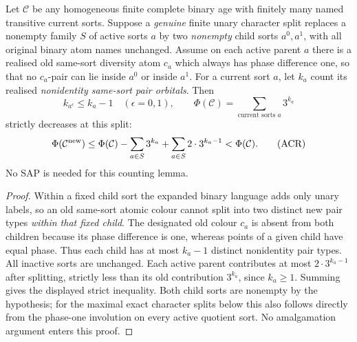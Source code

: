 \begin{lemma}
\label{lem:exact-character-rank-drop}
Let $\mathcal C$ be any homogeneous finite complete
binary age with finitely many named transitive current
sorts. Suppose a \emph{genuine} finite unary character
split replaces a nonempty family $S$ of active sorts
$a$ by two \emph{nonempty} child sorts
$a^0,a^1$, with all original binary atom names
unchanged. Assume on each active parent $a$
there is a realised old same-sort diversity atom
$c_a$ which always has phase difference one,
so that no $c_a$-pair can lie inside
$a^0$ or inside $a^1$.
For a current sort $a$, let $k_a$ count its realised
\emph{nonidentity same-sort pair orbitals}.
Then
\[
 k_{a^\epsilon}\le k_a-1\quad(\epsilon=0,1),
 \qquad
 \Phi(\mathcal C)=\sum_{\text{current sorts }a}3^{k_a}
\]
strictly decreases at this split:
\[
 \Phi(\mathcal C^{\rm new})
 \le \Phi(\mathcal C)
       -\sum_{a\in S}3^{k_a}
       +\sum_{a\in S}2\cdot3^{k_a-1}
 <\Phi(\mathcal C).
 \tag{ACR}\label{eq:exact-character-rank-drop}
\]
No SAP is needed for this counting lemma.
\end{lemma}
\begin{proof}
Within a fixed child sort the expanded binary
language adds only unary labels, so an old same-sort
atomic colour cannot split into two distinct
new pair types \emph{within that fixed child}.
The designated old colour $c_a$ is absent from
both children because its phase difference is one,
whereas points of a given child have equal phase.
Thus each child has at most $k_a-1$ distinct
nonidentity pair types. All inactive sorts are
unchanged. Each active parent contributes at most
$2\cdot3^{k_a-1}$ after splitting, strictly
less than its old contribution $3^{k_a}$,
since $k_a\ge1$. Summing gives the displayed
strict inequality. Both child sorts are nonempty
by the hypothesis; for the maximal exact character
splits below this also follows directly from
the phase-one involution on every active quotient
sort. No amalgamation argument enters this proof.
\end{proof}

